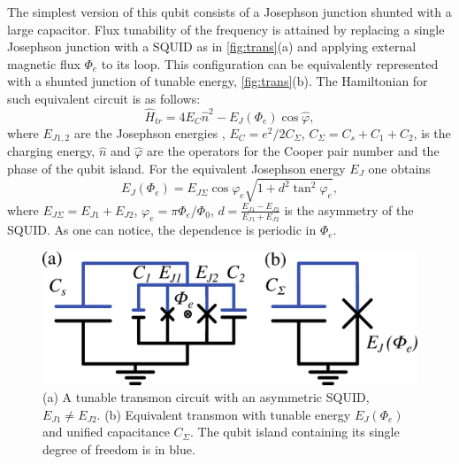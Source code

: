 \documentclass[%
 aip,
 amsmath,amssymb,
 reprint,%
]{revtex4-1}
\begin{document}
The simplest version of this qubit consists of a Josephson junction shunted with a large capacitor. Flux tunability of the frequency is attained by replacing a single Josephson junction with a SQUID as in \autoref{fig:trans}(a) and applying external magnetic flux $\Phi_e$ to its loop. This configuration can be equivalently represented with a shunted junction of tunable energy, \autoref{fig:trans}(b). The Hamiltonian for such equivalent circuit is as follows: 
\begin{equation}
\hat{H}_{tr} = 4E_C \hat n^2 - E_J(\Phi_e) \cos \hat\varphi,
\label{eq:tr_ham}
\end{equation}
where $E_{J1,2}$ are the Josephson energies , $E_C = e^2/2C_{\Sigma}$, $C_{\Sigma} = C_s + C_1 +C_2$, is the charging energy, $\hat n$ and $\hat \varphi$ are the operators for the Cooper pair number and the phase of the qubit island. For the equivalent Josephson energy $E_{J}$ one obtains
\begin{equation}
E_{J}(\Phi_e) = E_{J\Sigma}\cos\varphi_e \sqrt{1+d^2 \tan^2 \varphi_e},
\label{eq:EJ_Phie}
\end{equation}  
where $E_{J\Sigma} = E_{J1}+E_{J2}$, $\varphi_e = \pi \Phi_e/\Phi_0$, $d = \frac{E_{J1}-E_{J2}}{E_{J1}+E_{J2}}$ is the asymmetry of the SQUID. As one can notice, the dependence is periodic in $\Phi_e$.
\begin{figure}
\centering
\includegraphics[width=\linewidth]{transmon}
\caption{(a) A tunable transmon circuit with an asymmetric SQUID, $E_{J1} \neq E_{J2}$. (b) Equivalent transmon with tunable energy $E_{J}(\Phi_e)$ and unified capacitance $C_{\Sigma}$. The qubit island containing its single degree of freedom is in blue.}
\label{fig:trans}
\end{figure}
\end{document}
